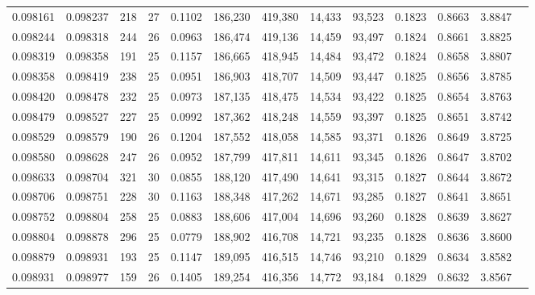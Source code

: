 \begin{tabular}{rrrrrrrrrrrrr}
0.098161 & 0.098237 & 218 &  27 &                                     0.1102 & 186,230 & 419,380 &  14,433 &  93,523 & 0.1823 & 0.8663 & 3.8847 \\
0.098244 & 0.098318 & 244 &  26 &                                     0.0963 & 186,474 & 419,136 &  14,459 &  93,497 & 0.1824 & 0.8661 & 3.8825 \\
0.098319 & 0.098358 & 191 &  25 &                                     0.1157 & 186,665 & 418,945 &  14,484 &  93,472 & 0.1824 & 0.8658 & 3.8807 \\
0.098358 & 0.098419 & 238 &  25 &                                     0.0951 & 186,903 & 418,707 &  14,509 &  93,447 & 0.1825 & 0.8656 & 3.8785 \\
0.098420 & 0.098478 & 232 &  25 &                                     0.0973 & 187,135 & 418,475 &  14,534 &  93,422 & 0.1825 & 0.8654 & 3.8763 \\
0.098479 & 0.098527 & 227 &  25 &                                     0.0992 & 187,362 & 418,248 &  14,559 &  93,397 & 0.1825 & 0.8651 & 3.8742 \\
0.098529 & 0.098579 & 190 &  26 &                                     0.1204 & 187,552 & 418,058 &  14,585 &  93,371 & 0.1826 & 0.8649 & 3.8725 \\
0.098580 & 0.098628 & 247 &  26 &                                     0.0952 & 187,799 & 417,811 &  14,611 &  93,345 & 0.1826 & 0.8647 & 3.8702 \\
0.098633 & 0.098704 & 321 &  30 &                                     0.0855 & 188,120 & 417,490 &  14,641 &  93,315 & 0.1827 & 0.8644 & 3.8672 \\
0.098706 & 0.098751 & 228 &  30 &                                     0.1163 & 188,348 & 417,262 &  14,671 &  93,285 & 0.1827 & 0.8641 & 3.8651 \\
0.098752 & 0.098804 & 258 &  25 &                                     0.0883 & 188,606 & 417,004 &  14,696 &  93,260 & 0.1828 & 0.8639 & 3.8627 \\
0.098804 & 0.098878 & 296 &  25 &                                     0.0779 & 188,902 & 416,708 &  14,721 &  93,235 & 0.1828 & 0.8636 & 3.8600 \\
0.098879 & 0.098931 & 193 &  25 &                                     0.1147 & 189,095 & 416,515 &  14,746 &  93,210 & 0.1829 & 0.8634 & 3.8582 \\
0.098931 & 0.098977 & 159 &  26 &                                     0.1405 & 189,254 & 416,356 &  14,772 &  93,184 & 0.1829 & 0.8632 & 3.8567 \\

\end{tabular}
